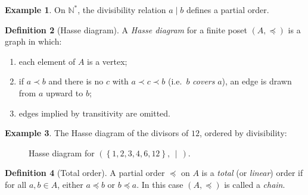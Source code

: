 \documentclass[12pt,a4paper,openany]{book}
\theoremstyle{definition}
\newtheorem{definition}{Definition}[chapter]
\newtheorem{example}[definition]{Example}
\theoremstyle{plain}
\theoremstyle{remark}
\newcommand{\N}{\mathbb{N}}
\newcommand{\set}[1]{\left\{#1\right\}}
\begin{document}
\begin{example}\label{ex:divisibility-poset}
On $\N^{*}$, the divisibility relation $a \mid b$ defines a partial order.
\end{example}

\begin{definition}[Hasse diagram]\label{def:hasse}
A \emph{Hasse diagram} for a finite poset $(A, \preceq)$ is a graph in which:
\begin{enumerate}[label=(\roman*)]
  \item each element of $A$ is a vertex;
  \item if $a \prec b$ and there is no $c$ with $a \prec c \prec b$
        (i.e.\ $b$ \emph{covers} $a$), an edge is drawn from $a$ upward to $b$;
  \item edges implied by transitivity are omitted.
\end{enumerate}
\end{definition}

\begin{example}\label{ex:hasse-divides-12}
The Hasse diagram of the divisors of $12$, ordered by divisibility:
\end{example}

\begin{figure}[ht]
\centering
{}
\caption{Hasse diagram for $(\set{1,2,3,4,6,12},\, \mid\,)$.}
\label{fig:hasse-12}
\end{figure}

\begin{definition}[Total order]\label{def:total-order}
A partial order $\preceq$ on $A$ is a \emph{total} (or \emph{linear}) order
if for all $a, b \in A$, either $a \preceq b$ or $b \preceq a$. In this case
$(A, \preceq)$ is called a \emph{chain}.
\end{definition}
\end{document}
